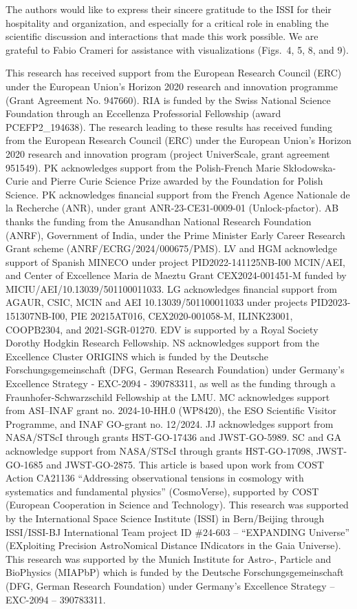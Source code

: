 \begin{acknowledgements}

The authors would like to express their sincere gratitude to the ISSI for their hospitality and organization, and especially for a critical role in enabling the scientific discussion and interactions that made this work possible.  We are grateful to Fabio Crameri for assistance with visualizations (Figs.~4, 5, 8, and 9).

This research has received support from the European Research Council (ERC) under the European Union's Horizon 2020 research and innovation programme (Grant Agreement No. 947660). RIA is funded by the Swiss National Science Foundation through an Eccellenza Professorial Fellowship (award PCEFP2\_194638).
The research leading to these results has received funding from the European Research Council (ERC) under the European Union's Horizon 2020 research and innovation program (project UniverScale, grant agreement 951549).
PK acknowledges support from the Polish-French Marie Sk{\l}odowska-Curie and Pierre Curie Science Prize awarded by the Foundation for Polish Science.
PK acknowledges financial support from the French Agence Nationale de la Recherche (ANR), under grant ANR-23-CE31-0009-01 (Unlock-pfactor).
AB thanks the funding from the Anusandhan National Research Foundation (ANRF), Government of India, under the Prime Minister Early Career Research Grant scheme (ANRF/ECRG/2024/000675/PMS). 
LV and HGM acknowledge support of Spanish MINECO under project PID2022-141125NB-I00 MCIN/AEI, and  Center of Excellence Maria de Maeztu Grant CEX2024-001451-M funded by MICIU/AEI/10.13039/501100011033.
LG acknowledges financial support from AGAUR, CSIC, MCIN and AEI 10.13039/501100011033 under projects PID2023-151307NB-I00, PIE 20215AT016, CEX2020-001058-M, ILINK23001, COOPB2304, and 2021-SGR-01270.
EDV is supported by a Royal Society Dorothy Hodgkin Research Fellowship. NS acknowledges support from the Excellence Cluster ORIGINS which is funded by the Deutsche Forschungsgemeinschaft (DFG, German Research Foundation) under Germany’s Excellence
Strategy - EXC-2094 - 390783311, as well as the funding through a Fraunhofer-Schwarzschild Fellowship at the LMU. 
MC acknowledges support from ASI–INAF grant no. 2024-10-HH.0 (WP8420), the ESO Scientific Visitor Programme, and INAF GO-grant no. 12/2024.
JJ acknowledges support from NASA/STScI through grants HST-GO-17436 and JWST-GO-5989.
SC and GA acknowledge support from NASA/STScI through grants HST-GO-17098, JWST-GO-1685 and JWST-GO-2875.
This article is based upon work from COST Action CA21136 ``Addressing observational tensions in cosmology with systematics and fundamental physics'' (CosmoVerse), supported by COST (European Cooperation in Science and Technology). This research was supported by the International Space Science Institute (ISSI) in Bern/Beijing through ISSI/ISSI-BJ International Team project ID $\#$24-603 – ``EXPANDING Universe'' (EXploiting Precision AstroNomical Distance INdicators in the Gaia Universe). This research was supported by the Munich Institute for Astro-, Particle and BioPhysics (MIAPbP) which is funded by the Deutsche Forschungsgemeinschaft (DFG, German Research Foundation) under Germany's Excellence Strategy – EXC-2094 – 390783311.


\end{acknowledgements}
